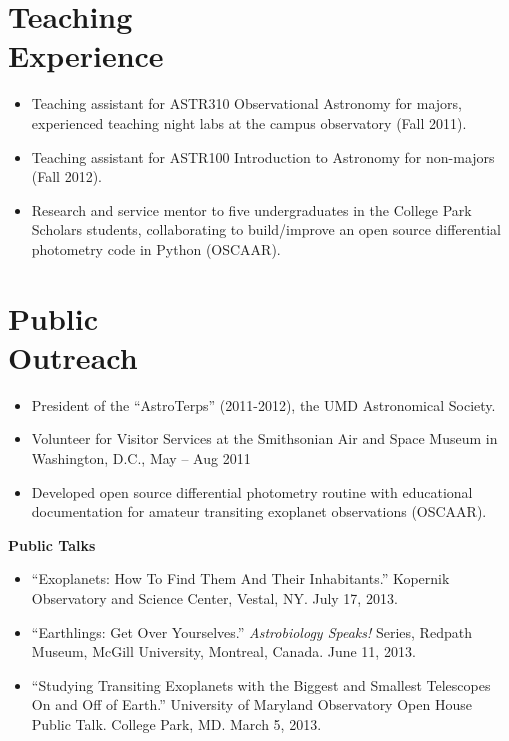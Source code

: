 \documentclass[margin]{res}
\begin{document}
\begin{resume}
\section{Teaching \\Experience}
            \begin{itemize}   
            \item Teaching assistant for ASTR310 Observational Astronomy for majors, experienced teaching night labs at the campus observatory (Fall 2011).
            \item Teaching assistant for ASTR100 Introduction to Astronomy for non-majors (Fall 2012).
            \item Research and service mentor to five undergraduates in the College Park Scholars students, collaborating to build/improve an open source differential photometry code in Python (OSCAAR). \\
            \end{itemize}
            
\section{Public \\ Outreach}             
            \begin{itemize}   
	   \item President of the ``AstroTerps'' (2011-2012), the UMD Astronomical Society.
            \item Volunteer for Visitor Services at the Smithsonian Air and Space Museum in Washington, D.C., May -- Aug 2011
            \item Developed open source differential photometry routine with educational documentation for amateur transiting exoplanet observations (OSCAAR).\\
            \end{itemize}
	   \textbf{Public Talks}
            \begin{itemize}   
                \item ``Exoplanets: How To Find Them And Their Inhabitants.'' Kopernik Observatory and Science Center, Vestal, NY. July 17, 2013. 
	       \item ``Earthlings: Get Over Yourselves.'' \textit{Astrobiology Speaks!} Series, Redpath Museum, McGill University, Montreal, Canada. June 11, 2013.	   
	       \item ``Studying Transiting Exoplanets with the Biggest and Smallest Telescopes On and Off of Earth.'' University of Maryland Observatory Open House Public Talk. College Park, MD. March 5, 2013.
            \end{itemize}
            

\end{resume}
\end{document}
